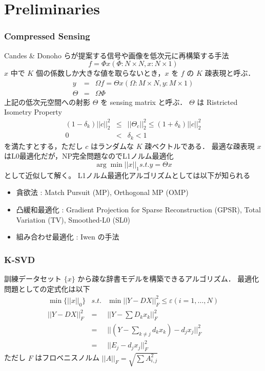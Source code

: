 \section{Preliminaries}
\begin{frame}\frametitle{Compressed Sensing}
Candes \& Donoho らが提案する信号や画像を低次元に再構築する手法
\begin{equation}
    f = \Phi x (\Phi: N \times N, x: N \times 1)
\end{equation}
$x$ 中で $K$ 個の係数しか大きな値を取らないとき，$x$ を $f$ の $K$ 疎表現と呼ぶ．
\begin{eqnarray}
    y & = & \Omega f = \Theta x (\Omega: M \times N, y: M \times 1) \\
    \Theta & = & \Omega \Phi
\end{eqnarray}
上記の低次元空間への射影 $\Theta$ を sensing matrix と呼ぶ．
$\Theta$ は Ristricted Isometry Property
\begin{eqnarray}
    (1 - \delta_k) ||c||^2_2 & \leq & || \Theta_c ||^2_2 \leq (1 + \delta_k) ||c||^2_2 \\
    0 & < & \delta_k < 1
\end{eqnarray}
を満たすとする，ただし $c$ はランダムな $K$ 疎ベクトルである．
最適な疎表現 $x$ はL0最適化だが，NP完全問題なのでL1ノルム最適化
\begin{equation}
    \arg \min ||x||_1 s.t. y = \Theta x
\end{equation}
として近似して解く。
L1ノルム最適化アルゴリズムとしては以下が知られる
\begin{itemize}
    \item 貪欲法 :
        Match Pursuit (MP),
        Orthogonal MP (OMP)
    \item 凸緩和最適化 :
        Gradient Projection for Sparse Reconstruction (GPSR),
        Total Variation (TV),
        Smoothed-L0 (SL0)
    \item 組み合わせ最適化 : Iwen の手法
\end{itemize}
\end{frame}


\begin{frame}\frametitle{K-SVD}
訓練データセット $\{ x \}$ から疎な辞書モデルを構築できるアルゴリズム．
最適化問題としての定式化は以下
\begin{eqnarray}
    \min \{||x||_0\} &s.t.& \min ||Y-DX||^2_F \leq \varepsilon (i = 1, \dots, N) \\
    ||Y-DX||^2_F &=& ||Y - \sum D_k x_k||^2_F \\
    &=& ||(Y - \sum_{k \neq j} d_k x_k) - d_j x_j||^2_F \\
    &=& ||E_j - d_j x_j||^2_F
\end{eqnarray}
ただし $F$ はフロベニスノルム $||A||_F = \sqrt{\sum{A^2_{i,j}}}$
\end{frame}
